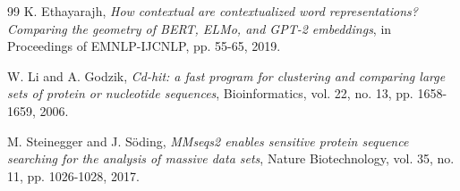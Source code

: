 \begin{thebibliography}{99}
K. Ethayarajh,
\textit{How contextual are contextualized word representations? Comparing the geometry of BERT, ELMo, and GPT-2 embeddings},
in Proceedings of EMNLP-IJCNLP, pp. 55-65, 2019.

W. Li and A. Godzik,
\textit{Cd-hit: a fast program for clustering and comparing large sets of protein or nucleotide sequences},
Bioinformatics, vol. 22, no. 13, pp. 1658-1659, 2006.

M. Steinegger and J. S\"oding,
\textit{MMseqs2 enables sensitive protein sequence searching for the analysis of massive data sets},
Nature Biotechnology, vol. 35, no. 11, pp. 1026-1028, 2017.

\end{thebibliography}
\endgroup

\clearpage

